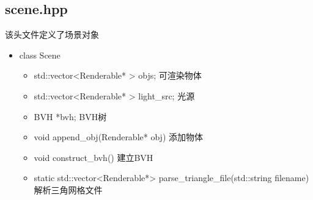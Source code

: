 \documentclass[12pt]{article}
\begin{document}
\subsection{scene.hpp}
该头文件定义了场景对象
\begin{itemize}
    \item class Scene
    \begin{itemize}
        \item std::vector<Renderable* > objs; 可渲染物体
        \item std::vector<Renderable* > light\_src; 光源
        \item BVH *bvh; BVH树
        \item void append\_obj(Renderable* obj) 添加物体
        \item void construct\_bvh() 建立BVH
        \item static std::vector<Renderable*> parse\_triangle\_file(std::string filename) 解析三角网格文件    
    \end{itemize}
\end{itemize}
\end{document}
